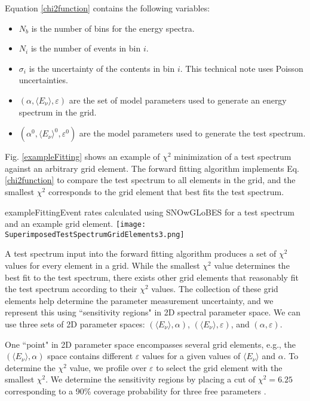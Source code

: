 Equation \ref{chi2function} contains the following variables:
\begin{itemize}
    \setlength\itemsep{0.1em}
    \item $N_b$ is the number of bins for the energy spectra.
    \item $N_{i}$ is the number of events in bin $i$.
    \item $\sigma_i$ is the uncertainty of the contents in bin $i$. This technical note uses Poisson uncertainties.
    \item $(\alpha, \langle E_\nu \rangle, \varepsilon)$ are the set of model parameters used to generate an energy spectrum in the grid.
    \item $(\alpha^0, \langle E_\nu \rangle^0, \varepsilon^0)$ are the model parameters used to generate the test spectrum.
\end{itemize}

Fig. \ref{exampleFitting} shows an example of $\chi^2$ minimization of a test spectrum against an arbitrary grid element. The forward fitting algorithm implements Eq. \ref{chi2function} to compare the test spectrum to all elements in the grid, and the smallest $\chi^2$ corresponds to the grid element that best fits the test spectrum.

\begin{dunefigure}{exampleFitting}{Event rates calculated using SNOwGLoBES for a test spectrum and an example grid element.}
	\texttt{[image: SuperimposedTestSpectrumGridElements3.png]}
\end{dunefigure}

A test spectrum input into the forward fitting algorithm produces a set of $\chi^2$ values for every element in a grid. While the smallest $\chi^2$ value determines the best fit to the test spectrum, there exists other grid elements that reasonably fit the test spectrum according to their $\chi^2$ values. The collection of these grid elements help determine the parameter measurement uncertainty, and we represent this using ``sensitivity regions" in 2D spectral parameter space. We can use three sets of 2D parameter spaces: $(\langle E_\nu \rangle, \alpha)$, $(\langle E_\nu \rangle, \varepsilon)$, and $(\alpha, \varepsilon)$.

One ``point" in 2D parameter space encompasses several grid elements, e.g., the $(\langle E_\nu \rangle, \alpha)$ space contains different $\varepsilon$ values for a given values of $\langle E_\nu \rangle$ and $\alpha$. To determine the $\chi^2$ value, we profile over $\varepsilon$ to select the grid element with the smallest $\chi^2$. We determine the sensitivity regions by placing a cut of $\chi^2 = 6.25$ corresponding to a 90\% coverage probability for three free parameters \cite{PDG}.

